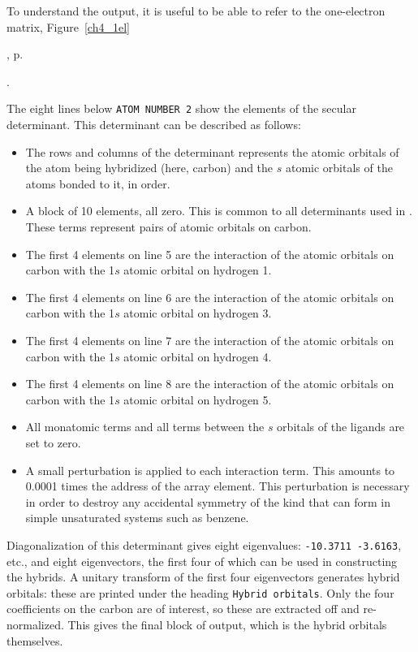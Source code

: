 To understand the output, it is useful to be able to refer to the one-electron
matrix, Figure~\ref{ch4_1el}
\begin{latexonly}
, p.~\pageref{ch4_1el}
\end{latexonly}.

The eight lines below \verb+ATOM NUMBER 2+ show the elements of the secular
determinant.  This determinant can be described as follows:
\begin{itemize}
\item The rows and columns of the determinant represents the atomic orbitals
of the atom being hybridized (here, carbon) and the $s$ atomic
orbitals of the atoms bonded to it, in order.
\item A block of 10 elements, all zero.  This is common to all determinants
used in . These terms represent pairs of atomic orbitals on carbon.
\item The first 4 elements on line 5 are the interaction of the atomic orbitals
on carbon with the 1$s$ atomic orbital on hydrogen 1.
\item The first 4 elements on line 6 are the interaction of the atomic orbitals
on carbon with the 1$s$ atomic orbital on hydrogen 3.
\item The first 4 elements on line 7 are the interaction of the atomic orbitals
on carbon with the 1$s$ atomic orbital on hydrogen 4.
\item The first 4 elements on line 8 are the interaction of the atomic orbitals
on carbon with the 1$s$ atomic orbital on hydrogen 5.
\item All monatomic terms and all terms between the $s$ orbitals of the ligands
are set to zero.
\item A small perturbation is applied to each interaction term.  This amounts
to 0.0001 times the address of the array element.  This perturbation is necessary
in order to destroy
any accidental symmetry of the kind that can form in simple unsaturated systems
such as benzene.
\end{itemize}

Diagonalization of this determinant gives eight eigenvalues:
\verb+-10.3711 -3.6163+, etc., and eight eigenvectors, the first four
of which can be used in constructing the hybrids.  A unitary transform of
the first four eigenvectors generates hybrid orbitals: these are printed under
the heading \verb+Hybrid orbitals+.  Only the four coefficients on the carbon
are of interest, so these are extracted off and re-normalized.  This
gives the final block of output, which is the hybrid orbitals themselves.

